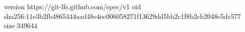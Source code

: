 version https://git-lfs.github.com/spec/v1
oid sha256:11e3b2fb4865444aad48e4ec006058271f13629dd5bb2c1f8b2cb2048c5dc577
size 349644

